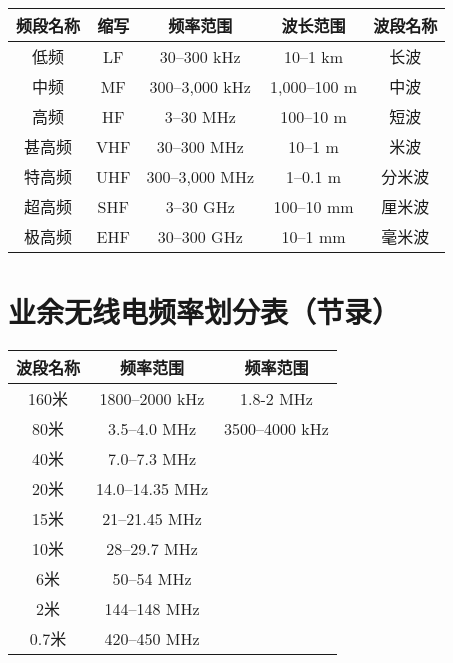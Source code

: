 \begin{tabular}{|c|c|c|c|c|}
	\hline
	\textbf{频段名称} & \textbf{缩写} & \textbf{频率范围} & \textbf{波长范围} & \textbf{波段名称} \\
	\hline
	低频 & LF & 30–300 kHz & 10–1 km & 长波 \\
	\hline
	中频 & MF & 300–3,000 kHz & 1,000–100 m & 中波 \\
	\hline
	高频 & HF & 3–30 MHz & 100–10 m & 短波 \\
	\hline
	甚高频 & VHF & 30–300 MHz & 10–1 m & 米波 \\
	\hline
	特高频 & UHF & 300–3,000 MHz & 1–0.1 m & 分米波 \\
	\hline
	超高频 & SHF & 3–30 GHz & 100–10 mm & 厘米波 \\
	\hline
	极高频 & EHF & 30–300 GHz & 10–1 mm & 毫米波 \\
	\hline
\end{tabular}

\newpage






\section{业余无线电频率划分表（节录）}


\begin{tabular}{|c|c|c|}
	\hline
	\textbf{波段名称} & \textbf{频率范围} & \textbf{频率范围} \\
	\hline
	160米 & 1800–2000 kHz & 1.8-2 MHz \\
	\hline
	80米 & 3.5–4.0 MHz & 3500–4000 kHz \\
	\hline
	40米 & 7.0–7.3 MHz &  \\
	\hline
	20米 & 14.0–14.35 MHz & \\
	\hline
	15米 & 21–21.45 MHz & \\
	\hline
	10米 & 28–29.7 MHz & \\
	\hline
	6米 & 50–54 MHz & \\
	\hline
	2米 & 144–148 MHz & \\
	\hline
	0.7米 & 420–450 MHz & \\
	\hline
\end{tabular}

